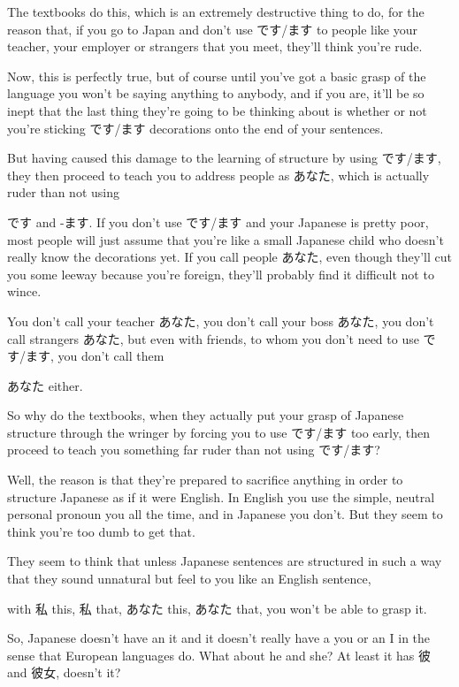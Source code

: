 \thinrule

The textbooks do this, which is an extremely destructive thing to do, for the reason that, if you go to Japan and don't use です/ます to people like your teacher, your employer or strangers that you meet, they'll think you're rude.

Now, this is perfectly true, but of course until you've got a basic grasp of the language you won't be saying anything to anybody, and if you are, it'll be so inept that the last thing they're going to be thinking about is whether or not you're sticking です/ます decorations onto the end of your sentences.

But having caused this damage to the learning of structure by using です/ます, they then proceed to teach you to address people as あなた, which is actually ruder than not using

です and -ます. If you don't use です/ます and your Japanese is pretty poor, most people will just assume that you're like a small Japanese child who doesn't really know the decorations yet. If you call people あなた, even though they'll cut you some leeway because you're foreign, they'll probably find it difficult not to wince.

You don't call your teacher あなた, you don't call your boss あなた, you don't call strangers あなた, but even with friends, to whom you don't need to use です/ます, you don't call them

あなた either.

So why do the textbooks, when they actually put your grasp of Japanese structure through the wringer by forcing you to use です/ます too early, then proceed to teach you something far ruder than not using です/ます?

\thinrule

Well, the reason is that they're prepared to sacrifice anything in order to structure Japanese as if it were English. In English you use the simple, neutral personal pronoun you all the time, and in Japanese you don't. But they seem to think you're too dumb to get that.

They seem to think that unless Japanese sentences are structured in such a way that they sound unnatural but feel to you like an English sentence,

with 私 this, 私 that, あなた this, あなた that, you won't be able to grasp it.

So, Japanese doesn't have an it and it doesn't really have a you or an I in the sense that European languages do. What about he and she? At least it has 彼 and 彼女, doesn't it?

